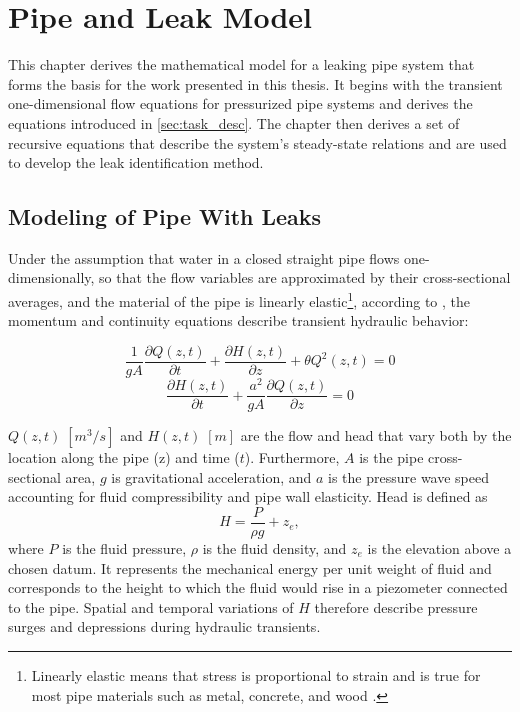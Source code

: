 \chapter{Pipe and Leak Model}
\label{chap:model}

This chapter derives the mathematical model for a leaking pipe system that forms the basis for the work presented in this thesis. It begins with the transient one-dimensional flow equations for pressurized pipe systems and derives the equations introduced in \autoref{sec:task_desc}. The chapter then derives a set of recursive equations that describe the system's steady-state relations and are used to develop the leak identification method.

\section{Modeling of Pipe With Leaks}

Under the assumption that water in a closed straight pipe flows one-dimensionally, so that the flow variables are approximated by their cross-sectional averages, and the material of the pipe is linearly elastic\footnote{Linearly elastic means that stress is proportional to strain and is true for most pipe materials such as metal, concrete, and wood \cite[p.~27]{chaudhry2013}.}, according to \cite[pp.~27-33]{chaudhry2013}, the momentum and continuity equations describe transient hydraulic behavior:

\begin{equation}\label{eq:momentum}
\frac{1}{gA}\frac{\partial Q(z,t)}{\partial t}
+ \frac{\partial H(z,t)}{\partial z}
+ \theta Q^{2}(z,t) = 0
\end{equation}
\begin{equation}\label{eq:continuity}
\frac{\partial H(z,t)}{\partial t}
+ \frac{a^{2}}{gA}\frac{\partial Q(z,t)}{\partial z} = 0
\end{equation}

$Q(z,t)\;[m^3/s]$ and $H(z,t)\;[m]$ are the flow and head that vary both by the location along the pipe (\gls{z}) and time ($t$). Furthermore, $A$ is the pipe cross-sectional area, $g$ is gravitational acceleration, and $a$ is the pressure wave speed accounting for fluid compressibility and pipe wall elasticity. Head is defined as
\[
H = \frac{P}{\rho g} + z_e,
\]
where $P$ is the fluid pressure, $\rho$ is the fluid density, and $z_e$ is the elevation above a chosen datum. It represents the mechanical energy per unit weight of fluid and corresponds to the height to which the fluid would rise in a piezometer connected to the pipe. Spatial and temporal variations of $H$ therefore describe pressure surges and depressions during hydraulic transients.\\

